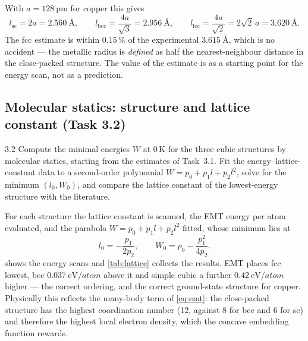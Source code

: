 \documentclass[11pt,a4paper]{article}
\numberwithin{equation}{section}
\theoremstyle{remark}
\begin{document}
With $a = \SI{128}{\pico\metre}$ for copper this gives
\begin{equation}\label{eq:hardsphere}
  l_{\mathrm{sc}} = 2a = \SI{2.560}{\angstrom},
  \qquad
  l_{\mathrm{bcc}} = \frac{4a}{\sqrt3} = \SI{2.956}{\angstrom},
  \qquad
  l_{\mathrm{fcc}} = \frac{4a}{\sqrt2} = 2\sqrt2\,a = \SI{3.620}{\angstrom}.
\end{equation}
The fcc estimate is within $0.15\,\%$ of the experimental $\SI{3.615}{\angstrom}$, which is no accident
--- the metallic radius is \emph{defined} as half the nearest-neighbour distance in the close-packed
structure. The value of the estimate is as a starting point for the energy scan, not as a prediction.

\subsection{Molecular statics: structure and lattice constant (Task 3.2)}\label{sec:statics}

\begin{task}{3.2}
  Compute the minimal energies $W$ at 0\,K for the three cubic structures by molecular statics,
  starting from the estimates of Task~3.1. Fit the energy--lattice-constant data to a second-order
  polynomial $W = p_0 + p_1 l + p_2 l^2$, solve for the minimum $(l_0, W_0)$, and compare the lattice
  constant of the lowest-energy structure with the literature.
\end{task}

For each structure the lattice constant is scanned, the EMT energy per atom evaluated, and the
parabola $W = p_0 + p_1 l + p_2 l^2$ fitted, whose minimum lies at
\begin{equation}\label{eq:parabola}
  l_0 = -\frac{p_1}{2p_2},
  \qquad
  W_0 = p_0 - \frac{p_1^2}{4p_2}.
\end{equation}
 shows the energy scans and \cref{tab:lattice} collects the results. EMT places
fcc lowest, bcc
$\SI{0.037}{\electronvolt\per atom}$ above it and simple cubic a further
$\SI{0.42}{\electronvolt\per atom}$ higher --- the correct ordering, and the correct ground-state
structure for copper. Physically this reflects the many-body term of \cref{eq:emt}: the close-packed
structure has the highest coordination number (12, against 8 for bcc and 6 for sc) and therefore the
highest local electron density, which the concave embedding function rewards.
\end{document}
